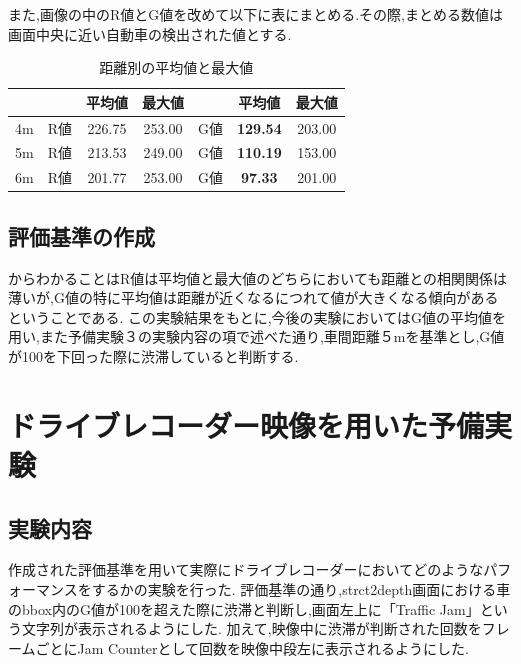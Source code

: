 
また,画像の中のR値とG値を改めて以下に表にまとめる.その際,まとめる数値は画面中央に近い自動車の検出された値とする.

\begin{table}[htbp]
  \centering
  \begin{scriptsize}
  \begin{tabular}{ccccccc}
  \toprule
& & 平均値 & 最大値 & & 平均値 & 最大値 \\
  \midrule
4m & R値 & 226.75 & 253.00 & G値 & {\bf129.54} & 203.00 \\
5m & R値 & 213.53 & 249.00 & G値 & {\bf 110.19} & 153.00 \\
6m & R値 & 201.77 & 253.00 & G値 & {\bf 97.33} & 201.00\\
  \bottomrule
  \end{tabular}
  \end{scriptsize}
  \caption{距離別の平均値と最大値}
  \label{tab:mean_max}
\end{table}

\subsection{評価基準の作成}
からわかることはR値は平均値と最大値のどちらにおいても距離との相関関係は薄いが,G値の特に平均値は距離が近くなるにつれて値が大きくなる傾向があるということである.
この実験結果をもとに,今後の実験においてはG値の平均値を用い,また予備実験３の実験内容の項で述べた通り,車間距離５mを基準とし,G値が100を下回った際に渋滞していると判断する.

\section{ドライブレコーダー映像を用いた予備実験}
\subsection{実験内容}
作成された評価基準を用いて実際にドライブレコーダーにおいてどのようなパフォーマンスをするかの実験を行った.
評価基準の通り,strct2depth画面における車のbbox内のG値が100を超えた際に渋滞と判断し,画面左上に「Traffic Jam」という文字列が表示されるようにした.
加えて,映像中に渋滞が判断された回数をフレームごとにJam Counterとして回数を映像中段左に表示されるようにした.

